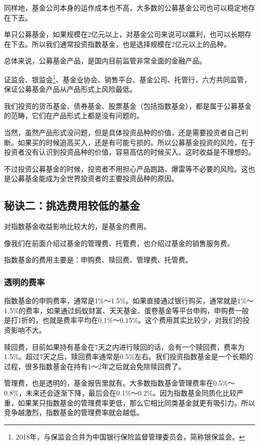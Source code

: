 同样地，基金公司本身的运作成本也不高，大多数的公募基金公司也可以稳定地存在下去。

单只公募基金，如果规模在2亿元以上，对基金公司来说可以赢利，也可以长期存在下去。所以我们通常投资指数基金，也是选择规模在2亿元以上的品种。

总体来说，公募基金产品，是国内目前监管非常全面的金融产品。

证监会、银监会\footnote{2018年，与保监会合并为中国银行保险监督管理委员会，简称银保监会。}、基金业协会、销售平台、基金公司、托管行，六方共同监管，保证公募基金产品从产品形式上风险最低。

我们投资的货币基金、债券基金、股票基金（包括指数基金），都是属于公募基金的范畴，它们在产品形式上都是没有问题的。

当然，虽然产品形式没问题，但是具体投资品种的价值，还是需要投资者自己判断。如果买的时候追高买入，还是有可能亏损的。所以公募基金投资的风险，在于投资者没有认识到投资品种的价值，容易高估的时候买入。这时收益是不理想的。

不过投资公募基金的时候，投资者不用担心产品跑路、爆雷等不必要的风险。这也是公募基金能成为全世界投资者的主要投资品种的原因。


\subsection{秘诀二：挑选费用较低的基金}
对指数基金收益影响比较大的，是基金的费用。

像我们在前面介绍过基金的管理费、托管费，也介绍过基金的销售服务费。

指数基金的费用主要是：申购费、赎回费、管理费、托管费。

\subsubsection{透明的费率}

指数基金的申购费率，通常是1\%～1.5\%。如果直接通过银行购买，通常就是1\%～1.5\%的费率，如果通过蚂蚁财富、天天基金、蛋卷基金等平台申购，申购费一般是打1折的，也就是费率平均在0.1\%～0.15\%。这个费用其实比较少，对我们的投资影响不大。

赎回费，目前如果持有基金在7天之内进行赎回的话，会有一个赎回费，费率为1.5\%。超过7天之后，赎回费率通常是0.5\%左右。我们投资指数基金是一个长期的过程，很多指数基金在持有1～2年之后就会免除赎回费了。

管理费，也是透明的，基金报告里就有。大多数指数基金管理费率在0.5\%～0.8\%，未来还会逐渐下降，最后会在0.1\%～0.2\%。因为指数基金同质化比较严重，如果某只指数基金的管理费率更低，那么它相比同类基金就更有吸引力。所以竞争越激烈，指数基金的管理费率就会越低。

